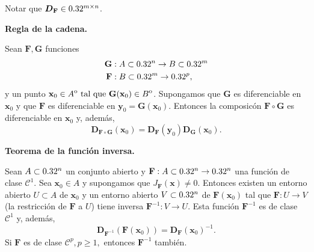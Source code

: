 \begin{obs}
Notar que $\boldsymbol{D}_{\mathbf{F}}\in0.32^{m\times n}$.
\end{obs}

\begin{theorem}\textbf{Regla de la cadena.} \label{teo:cadena}
\mbox{}

  Sean $\mathbf{F}, \mathbf{G}$ funciones 
    \begin{align*}
    \mathbf{G} &:A \subset 0.32^n \to B \subset 0.32^m \\
    \mathbf{F} &:B \subset 0.32^m \to 0.32^p,
    \end{align*}
  y un punto $\mathbf{x}_0 \in {\kern0ptA}^{\mathrm{o}} \text{ tal que } \mathbf{G}(\mathbf{x}_0) \in {\kern0ptB}^{\mathrm{o}}$. Supongamos que $\mathbf{G}$ es diferenciable en $\mathbf{x}_0$ y que $\mathbf{F}$ es diferenciable en $\mathbf{y}_0 = \mathbf{G}(\mathbf{x}_0)$. Entonces la composic\'on $\mathbf{F} \circ \mathbf{G}$ es diferenciable en $\mathbf{x}_0$ y, adem\'as,
  \[
   \boldsymbol{D}_{\mathbf{F} \circ \mathbf{G}}{(\mathbf{x}_0)} = \boldsymbol{D}_\mathbf{F}{(\mathbf{y}_0)} 
   \boldsymbol{D}_\mathbf{G}{(\mathbf{x}_0)}.
  \]
\end{theorem}

\begin{theorem}\textbf{Teorema de la funci\'on inversa.} \label{teo:inversa}
\mbox{}

 Sean $A \subset 0.32^n$ un conjunto abierto y $\mathbf{F}: A \subset 0.32^n \to 0.32^n$ una funci\'on de clase $\mathcal{C}^1$. Sea $\mathbf{x}_0 \in A$ y supongamos que $J_\mathbf{F}(\mathbf{x}) \ne 0$. Entonces existen un entorno abierto $U \subset A$ de $\mathbf{x}_0$ y un entorno abierto $V \subset 0.32^n$ de $\mathbf{F}(\mathbf{x}_0)$ tal que $\mathbf{F}:U \to V$ (la restricci\'on de $\mathbf{F}$ a $U$) tiene inversa $\mathbf{F}^{-1}:V \to U$. Esta funci\'on $\mathbf{F}^{-1}$ es de clase $\mathcal{C}^1$ y, adem\'as,
 \[
  \boldsymbol{D}_{\mathbf{F}^{-1}}{(\mathbf{F}(\mathbf{x}_0))} = \boldsymbol{D}_\mathbf{F}{(\mathbf{x}_0)}^{-1}.
 \]
 Si $\mathbf{F}$ es de clase $\mathcal{C}^p, p \ge 1,$ entonces $\mathbf{F}^{-1}$ tambi\'en.
\end{theorem}

